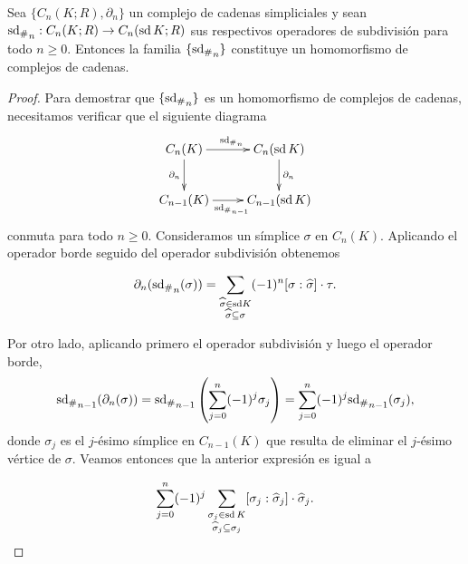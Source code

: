 \begin{lema}
	Sea $\{C_n(K; R), \partial_n\}$ un complejo de cadenas simpliciales y sean ${\operatorname{sd}_\#}_n : C_n(K; R) \to C_n(\operatorname{sd} K; R)$ sus respectivos operadores de subdivisión para todo $n \geq 0$. Entonces la familia $\{{\operatorname{sd}_\#}_n\}$ constituye un homomorfismo de complejos de cadenas.
\end{lema}
\begin{proof}
	Para demostrar que $\{{\operatorname{sd}_\#}_n\}$ es un homomorfismo de complejos de cadenas, necesitamos verificar que el siguiente diagrama
	\[
		\xymatrix{
		C_n(K) \ar[r]^{{\sd_\#}_n} \ar[d]_{\partial_n} & C_n(\sd K) \ar[d]^{\partial_n} \\
		C_{n-1}(K) \ar[r]_{{\sd_\#}_{n-1}} & C_{n-1}(\sd K)
		}
	\]
	conmuta para todo $n \geq 0$.
	Consideramos un símplice $\sigma$ en $C_n(K)$. Aplicando el operador borde seguido del operador subdivisión obtenemos

	\begin{equation}
		\label{eq:comp-subdv-borde}
		\partial_n ({\operatorname{sd}_\#}_n(\sigma)) = \sum_{\substack{\widehat{\sigma} \in \text{sd} K \\ \widehat{\sigma} \subseteq \sigma}} (-1)^{n} [\sigma : \widehat{\sigma}] \cdot \tau.
	\end{equation}

	Por otro lado, aplicando primero el operador subdivisión y luego el operador borde,
	\[
		{\operatorname{sd}_\#}_{n-1}(\partial_n(\sigma)) = {\operatorname{sd}_\#}_{n-1} \left( \sum_{j=0}^{n} (-1)^j \sigma_j \right) = \sum_{j=0}^{n} (-1)^j {\operatorname{sd}_\#}_{n-1}(\sigma_j),
	\]
	donde $\sigma_j$ es el $j$-ésimo símplice en $C_{n-1}(K)$ que resulta de eliminar el $j$-ésimo vértice de $\sigma$. Veamos entonces que la anterior expresión es igual a

	\begin{equation}
		\label{eq:comp-borde-subdv}
		\sum_{j=0}^{n} (-1)^j \sum_{\substack{\sigma_j \in \operatorname{sd} K \\ \widehat{\sigma}_j \subseteq \sigma_j}} [\sigma_j : \widehat{\sigma}_j] \cdot \widehat{\sigma}_j.
	\end{equation}


\end{proof}
